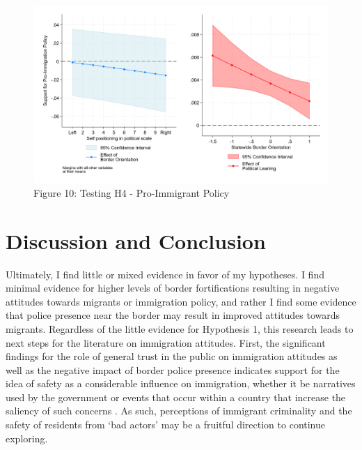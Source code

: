 \documentclass[12pt,]{article}
\begin{document}
\begin{figure}
\centering
\includegraphics{figures/m6_policy_marginal_1.png}
\caption{Figure 10: Testing H4 - Pro-Immigrant Policy}
\end{figure}

\section{Discussion and Conclusion}\label{discussion-and-conclusion}

Ultimately, I find little or mixed evidence in favor of my hypotheses. I
find minimal evidence for higher levels of border fortifications
resulting in negative attitudes towards migrants or immigration policy,
and rather I find some evidence that police presence near the border may
result in improved attitudes towards migrants. Regardless of the little
evidence for Hypothesis 1, this research leads to next steps for the
literature on immigration attitudes. First, the significant findings for
the role of general trust in the public on immigration attitudes as well
as the negative impact of border police presence indicates support for
the idea of safety as a considerable influence on immigration, whether
it be narratives used by the government \citep{bajomi-lazar2019} or
events that occur within a country that increase the saliency of such
concerns \citep{young2018}. As such, perceptions of immigrant
criminality and the safety of residents from `bad actors' may be a
fruitful direction to continue exploring.
\end{document}
